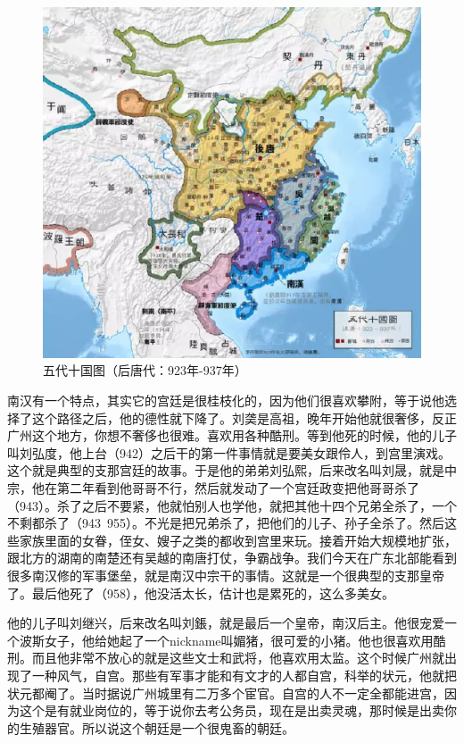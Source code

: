 \begin{figure}
	\centering
	\includegraphics[width=\textwidth]{images/image-30}
	\caption{五代十国图（后唐代：923年-937年）}
\end{figure}

南汉有一个特点，其实它的宫廷是很桂枝化的，因为他们很喜欢攀附，等于说他选择了这个路径之后，他的德性就下降了。刘䶮是高祖，晚年开始他就很奢侈，反正广州这个地方，你想不奢侈也很难。喜欢用各种酷刑。等到他死的时候，他的儿子叫刘弘度，他上台（942）之后干的第一件事情就是要美女跟伶人，到宫里演戏。这个就是典型的支那宫廷的故事。于是他的弟弟刘弘熙，后来改名叫刘晟，就是中宗，他在第二年看到他哥哥不行，然后就发动了一个宫廷政变把他哥哥杀了（943）。杀了之后不要紧，他就怕别人也学他，就把其他十四个兄弟全杀了，一个不剩都杀了（943~955）。不光是把兄弟杀了，把他们的儿子、孙子全杀了。然后这些家族里面的女眷，侄女、嫂子之类的都收到宫里来玩。接着开始大规模地扩张，跟北方的湖南的南楚还有吴越的南唐打仗，争霸战争。我们今天在广东北部能看到很多南汉修的军事堡垒，就是南汉中宗干的事情。这就是一个很典型的支那皇帝了。最后他死了（958），他没活太长，估计也是累死的，这么多美女。

他的儿子叫刘继兴，后来改名叫刘鋹，就是最后一个皇帝，南汉后主。他很宠爱一个波斯女子，他给她起了一个nickname叫媚猪，很可爱的小猪。他也很喜欢用酷刑。而且他非常不放心的就是这些文士和武将，他喜欢用太监。这个时候广州就出现了一种风气，自宫。那些有军事才能和有文才的人都自宫，科举的状元，他就把状元都阉了。当时据说广州城里有二万多个宦官。自宫的人不一定全都能进宫，因为这个是有就业岗位的，等于说你去考公务员，现在是出卖灵魂，那时候是出卖你的生殖器官。所以说这个朝廷是一个很鬼畜的朝廷。

